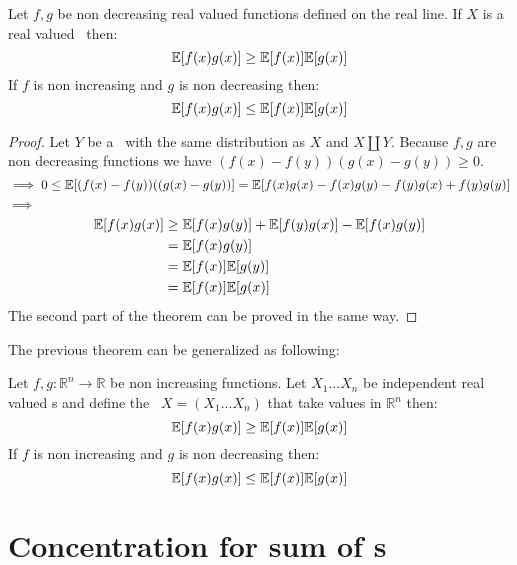 \begin{teo}
	Let $f,g$ be non decreasing real valued functions defined on the real line. If $X$ is a real valued \rv \  then:$$\mathbb{E}[f(x)g(x)]\geq \mathbb{E}[f(x)]\mathbb{E}[g(x)]$$
	If $f$ is non increasing and $g$ is non decreasing then:
	$$\mathbb{E}[f(x)g(x)]\leq \mathbb{E}[f(x)]\mathbb{E}[g(x)]$$ 
\end{teo}
\begin{proof}
	Let $Y$ be a \rv \  with the same distribution as $X$ and $X\coprod Y$. Because $f,g$ are non decreasing functions we have $(f(x)-f(y))(g(x)-g(y))\geq 0$.
	\[
		\implies  0 \leq \mathbb{E}[(f(x)-f(y))((g(x)-g(y))]=\mathbb{E}[f(x)g(x)-f(x)g(y)-f(y)g(x) + f(y)g(y)]
	\]
	$\implies$
	\[
	\begin{split}
\mathbb{E}[f(x)g(x)] &\geq \mathbb{E}[f(x)g(y)]+ \mathbb{E}[f(y)g(x)]- \mathbb{E}[f(x)g(y)] \\&=\mathbb{E}[f(x)g(y)]\\&=\mathbb{E}[f(x)]\mathbb{E}[g(y)]\\&=\mathbb{E}[f(x)]\mathbb{E}[g(x)]
	\end{split}
	\]
	The second part of the theorem can be proved in the same way.
\end{proof}
The previous theorem can be generalized as following:
\begin{teo}
	Let $f,g: \mathbb{R}^n\to \mathbb{R}$ be non increasing functions. Let $X_1...X_n$ be independent real valued \rv s and define the \rv \ $X=(X_1...X_n)$ that take values in $\mathbb{R}^n$ then:
	$$\mathbb{E}[f(x)g(x)]\geq \mathbb{E}[f(x)]\mathbb{E}[g(x)]$$
	If $f$ is non increasing and $g$ is non decreasing then:
	$$\mathbb{E}[f(x)g(x)]\leq \mathbb{E}[f(x)]\mathbb{E}[g(x)]$$
\end{teo}

\section{Concentration for sum of \rv s}

